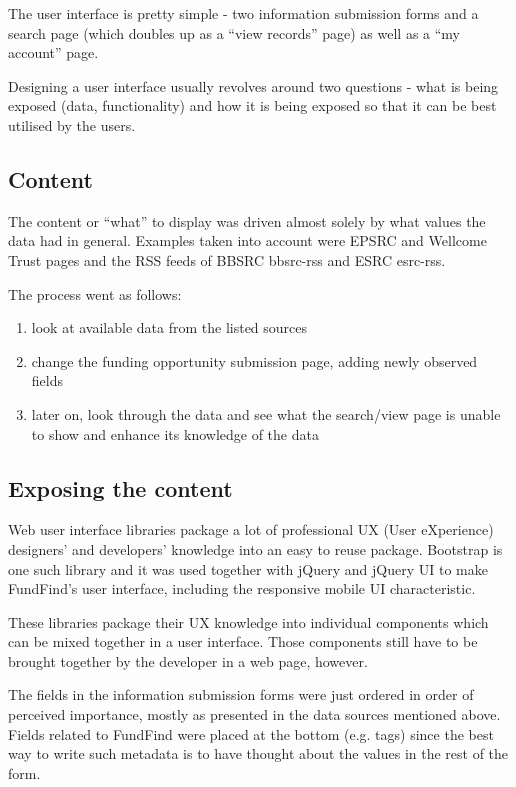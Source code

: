 The user interface is pretty simple - two information submission forms and a search page (which doubles up as a ``view records'' page) as well as a ``my account'' page.

Designing a user interface usually revolves around two questions - what is being exposed (data, functionality) and how it is being exposed so that it can be best utilised by the users.

\subsection{Content}
The content or ``what'' to display was driven almost solely by what values the data had in general. Examples taken into account were EPSRC \cite{epsrc-example} and Wellcome Trust \cite{wellcome-example} pages and the RSS feeds of BBSRC {bbsrc-rss} and ESRC {esrc-rss}.

The process went as follows:
\begin{enumerate}
\item look at available data from the listed sources
\item change the funding opportunity submission page, adding newly observed fields
\item later on, look through the data and see what the search/view page is unable to show and enhance its knowledge of the data
\end{enumerate}

\subsection{Exposing the content}
\label{design-ui-exposing-the-content}
Web user interface libraries package a lot of professional UX (User eXperience) designers' and developers' knowledge into an easy to reuse package. Bootstrap \cite{bootstrap} is one such library and it was used together with jQuery \cite{jquery} and jQuery UI\cite{jquery-ui} to make FundFind's user interface, including the responsive mobile UI characteristic.

These libraries package their UX knowledge into individual components which can be mixed together in a user interface. Those components still have to be brought together by the developer in a web page, however.

The fields in the information submission forms were just ordered in order of perceived importance, mostly as presented in the data sources mentioned above. Fields related to FundFind were placed at the bottom (e.g. tags) since the best way to write such metadata is to have thought about the values in the rest of the form.

